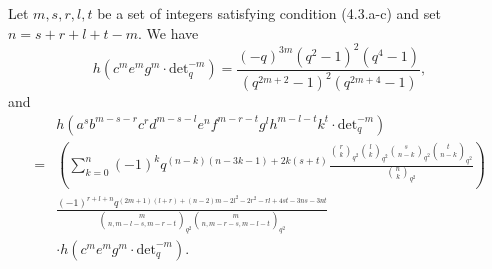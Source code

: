 \documentclass[10pt,a4paper]{amsart}
\begin{document}
\begin{theorem}
     Let $m,s,r,l,t$ be a set of integers satisfying condition (4.3.a-c) and set $n=s+r+l+t-m$. We have
     \begin{equation}\tag{4.23}
         h\left(c^me^mg^m\cdot\text{det}_q^{-m}\right)=\frac{(-q)^{3m}(q^2-1)^2(q^4-1)}{(q^{2m+2}-1)^2(q^{2m+4}-1)},
     \end{equation}
     and
    \begin{equation}\label{eq:4.73}
        \begin{split}
            &h(a^sb^{m-s-r}c^rd^{m-s-l}e^{n}f^{m-r-t}g^lh^{m-l-t}k^t\cdot\text{det}_q^{-m})\\
            =&\left(\sum_{k=0}^{n}(-1)^{k}q^{(n-k)(n-3k-1)+2k(s+t)}\frac{{r\choose k}_{q^2}{l\choose k}_{q^2}{s\choose n-k}_{q^2}{t\choose n-k}_{q^2}}{{n\choose k}_{q^2}}\right)\\
            &\frac{(-1)^{r+l+n}q^{(2m+1)(l+r)+(n-2)m-2l^2-2r^2-rl+4st-3ns-3nt}}{{m\choose n,m-l-s,m-r-t}_{q^2}{m\choose n,m-r-s,m-l-t}_{q^2}}\\
            &\cdot h\left(c^me^mg^m\cdot\text{det}_q^{-m}\right).
        \end{split}
    \end{equation}
\end{theorem}
\end{document}
